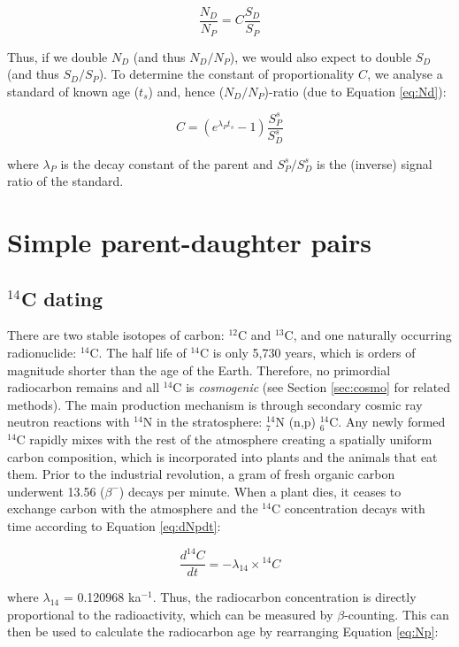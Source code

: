 \documentclass{book}
\begin{document}
\begin{equation}
\frac{N_D}{N_P} = C \frac{S_D}{S_P}
\label{eq:eqC}
\end{equation}

Thus, if we double $N_D$ (and thus $N_D/N_P$), we would also expect to
double $S_D$ (and thus $S_D/S_P$). To determine the constant of
proportionality $C$, we analyse a standard of known age ($t_s$) and,
hence ($N_D/N_P$)-ratio (due to Equation \ref{eq:Nd}):

\begin{equation}
C = \left(e^{\lambda_Pt_s} - 1\right) \frac{S^s_P}{S^s_D}
\label{eq:const}
\end{equation}

where $\lambda_P$ is the decay constant of the parent and
$S^s_P/S^s_D$ is the (inverse) signal ratio of the standard.

\chapter{Simple parent-daughter pairs}

\section{$^{14}$C dating}
\label{sec:14C}

There are two stable isotopes of carbon: $^{12}$C and $^{13}$C, and
one naturally occurring radionuclide: $^{14}$C. The half life of
$^{14}$C is only 5,730 years, which is orders of magnitude shorter
than the age of the Earth. Therefore, no primordial radiocarbon
remains and all $^{14}$C is \emph{cosmogenic} (see Section
\ref{sec:cosmo} for related methods).  The main production mechanism
is through secondary cosmic ray neutron reactions with $^{14}$N in the
stratosphere: $^{14}_7$N (n,p) $^{14}_6$C. Any newly formed $^{14}$C
rapidly mixes with the rest of the atmosphere creating a spatially
uniform carbon composition, which is incorporated into plants and the
animals that eat them. Prior to the industrial revolution, a gram of
fresh organic carbon underwent 13.56 ($\beta^-$) decays per
minute. When a plant dies, it ceases to exchange carbon with the
atmosphere and the $^{14}$C concentration decays with time according
to Equation \ref{eq:dNpdt}:

\begin{equation}
\frac{d^{14}C}{dt} = -\lambda_{14} \times {}^{14}C
\label{eq:d14Cdt}
\end{equation}

where $\lambda_{14}$ = 0.120968 ka$^{-1}$. Thus, the radiocarbon
concentration is directly proportional to the radioactivity, which can
be measured by $\beta$-counting. This can then be used to calculate
the radiocarbon age by rearranging Equation \ref{eq:Np}:
\end{document}
